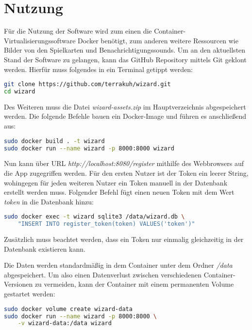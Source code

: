\chapter{Nutzung}
Für die Nutzung der Software wird zum einen die Container-Virtualisierungssoftware Docker benötigt, zum anderen weitere Ressourcen wie Bilder von den Spielkarten und Benachrichtigungssounds. Um an den aktuellsten Stand der Software zu gelangen, kann das GitHub Repository mittels Git geklont werden. Hierfür muss folgendes in ein Terminal getippt werden:

\begin{lstlisting}[language=bash]
git clone https://github.com/terrakuh/wizard.git
cd wizard
\end{lstlisting}

Des Weiteren muss die Datei \textit{wizard-assets.zip} im Hauptverzeichnis abgespeichert werden. Die folgende Befehle bauen ein Docker-Image und führen es anschließend aus:

\begin{lstlisting}[language=bash]
sudo docker build . -t wizard
sudo docker run --name wizard -p 8000:8000 wizard
\end{lstlisting}

Nun kann über URL \textit{http://localhost:8080/register} mithilfe des Webbrowsers auf die App zugegriffen werden. Für den ersten Nutzer ist der Token ein leerer String, wohingegen für jeden weiteren Nutzer ein Token manuell in der Datenbank erstellt werden muss. Folgender Befehl fügt einen neuen Token mit dem Wert \textit{token} in die Datenbank hinzu:

\begin{lstlisting}[language=bash]
sudo docker exec -t wizard sqlite3 /data/wizard.db \
	"INSERT INTO register_token(token) VALUES('token')"
\end{lstlisting}

Zusätzlich muss beachtet werden, dass ein Token nur einmalig gleichzeitig in der Datenbank existieren kann.

Die Daten werden standardmäßig in dem Container unter dem Ordner \textit{/data} abgespeichert. Um also einen Datenverlust zwischen verschiedenen Container-Versionen zu vermeiden, kann der Container mit einem permanenten Volume gestartet werden:

\begin{lstlisting}[language=bash]
sudo docker volume create wizard-data
sudo docker run --name wizard -p 8000:8000 \
	-v wizard-data:/data wizard
\end{lstlisting}

